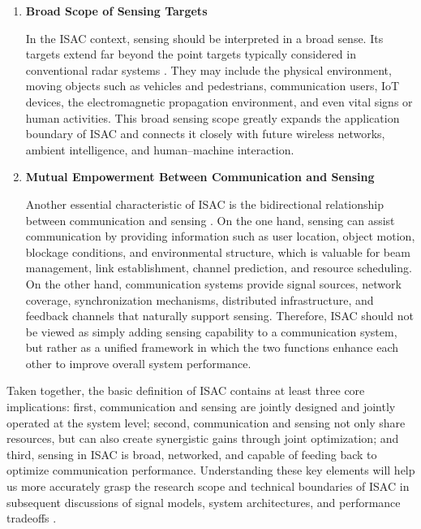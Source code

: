 \begin{enumerate}[label=(\arabic*)]
    \item \textbf{Broad Scope of Sensing Targets}
    
    In the ISAC context, sensing should be interpreted in a broad sense. Its targets extend far beyond the point targets typically considered in conventional radar systems \cite{Liu2022ISAC,Gonzalez2024integrated}. They may include the physical environment, moving objects such as vehicles and pedestrians, communication users, IoT devices, the electromagnetic propagation environment, and even vital signs or human activities. This broad sensing scope greatly expands the application boundary of ISAC and connects it closely with future wireless networks, ambient intelligence, and human--machine interaction.
    
    \item \textbf{Mutual Empowerment Between Communication and Sensing}
    
    Another essential characteristic of ISAC is the bidirectional relationship between communication and sensing \cite{Liu2022ISAC,Zhang2021ISAC6G}. On the one hand, sensing can assist communication by providing information such as user location, object motion, blockage conditions, and environmental structure, which is valuable for beam management, link establishment, channel prediction, and resource scheduling. On the other hand, communication systems provide signal sources, network coverage, synchronization mechanisms, distributed infrastructure, and feedback channels that naturally support sensing. Therefore, ISAC should not be viewed as simply adding sensing capability to a communication system, but rather as a unified framework in which the two functions enhance each other to improve overall system performance.
\end{enumerate}

Taken together, the basic definition of ISAC contains at least three core implications: first, communication and sensing are jointly designed and jointly operated at the system level; second, communication and sensing not only share resources, but can also create synergistic gains through joint optimization; and third, sensing in ISAC is broad, networked, and capable of feeding back to optimize communication performance. Understanding these key elements will help us more accurately grasp the research scope and technical boundaries of ISAC in subsequent discussions of signal models, system architectures, and performance tradeoffs \cite{Liu2022ISAC,Liu2020JointRadarComm,Gonzalez2024integrated}.

